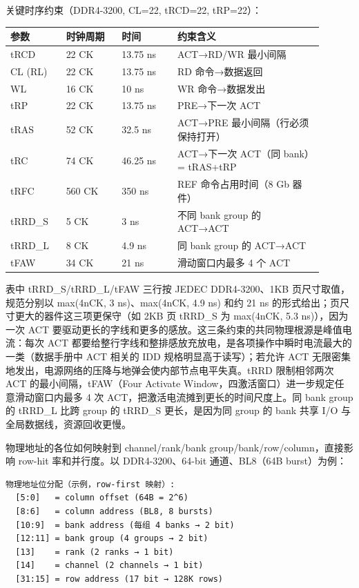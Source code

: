 关键时序约束（DDR4-3200, CL=22, tRCD=22, tRP=22）：

\begin{longtable}{L{0.16\linewidth}L{0.16\linewidth}L{0.16\linewidth}L{0.42\linewidth}}
\toprule
参数 & 时钟周期 & 时间 & 约束含义 \\
\midrule
tRCD & 22 CK & 13.75 ns & ACT→RD/WR 最小间隔 \\
CL (RL) & 22 CK & 13.75 ns & RD 命令→数据返回 \\
WL & 16 CK & 10 ns & WR 命令→数据发出 \\
tRP & 22 CK & 13.75 ns & PRE→下一次 ACT \\
tRAS & 52 CK & 32.5 ns & ACT→PRE 最小间隔（行必须保持打开） \\
tRC & 74 CK & 46.25 ns & ACT→下一次 ACT（同 bank）= tRAS+tRP \\
tRFC & 560 CK & 350 ns & REF 命令占用时间（8 Gb 器件） \\
tRRD\_S & 5 CK & 3 ns & 不同 bank group 的 ACT→ACT \\
tRRD\_L & 8 CK & 4.9 ns & 同 bank group 的 ACT→ACT \\
tFAW & 34 CK & 21 ns & 滑动窗口内最多 4 个 ACT \\
\bottomrule
\end{longtable}

表中 tRRD\_S/tRRD\_L/tFAW 三行按 JEDEC DDR4-3200、1KB 页尺寸取值，规范分别以 max(4nCK, 3 ns)、max(4nCK, 4.9 ns) 和约 21 ns 的形式给出；页尺寸更大的器件这三项更保守（如 2KB 页 tRRD\_S 为 max(4nCK, 5.3 ns)），因为一次 ACT 要驱动更长的字线和更多的感放。这三条约束的共同物理根源是峰值电流：每次 ACT 都要给整行字线和整排感放充放电，是各项操作中瞬时电流最大的一类（数据手册中 ACT 相关的 IDD 规格明显高于读写）；若允许 ACT 无限密集地发出，电源网络的压降与地弹会使内部节点电平失真。tRRD 限制相邻两次 ACT 的最小间隔，tFAW（Four Activate Window，四激活窗口）进一步规定任意滑动窗口内最多 4 次 ACT，把激活电流摊到更长的时间尺度上。同 bank group 的 tRRD\_L 比跨 group 的 tRRD\_S 更长，是因为同 group 的 bank 共享 I/O 与全局数据线，资源回收更慢。


物理地址的各位如何映射到 channel/rank/bank group/bank/row/column，直接影响 row-hit 率和并行度。以 DDR4-3200、64-bit 通道、BL8（64B burst）为例：

\begin{lstlisting}
物理地址位分配（示例，row-first 映射）:
  [5:0]   = column offset (64B = 2^6)
  [8:6]   = column address (BL8, 8 bursts)
  [10:9]  = bank address (每组 4 banks → 2 bit)
  [12:11] = bank group (4 groups → 2 bit)
  [13]    = rank (2 ranks → 1 bit)
  [14]    = channel (2 channels → 1 bit)
  [31:15] = row address (17 bit → 128K rows)
\end{lstlisting}

